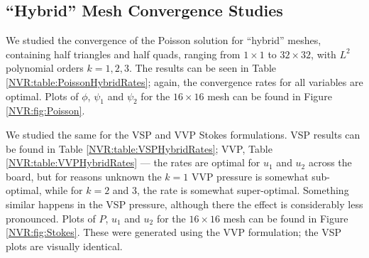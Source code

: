 \subsection{``Hybrid'' Mesh Convergence Studies}

We studied the convergence of the Poisson solution for ``hybrid'' meshes, containing half triangles and half quads, ranging from $1 \times 1$ to $32 \times 32$, with $L^{2}$ polynomial orders $k=1,2,3$.  The results can be seen in Table \ref{NVR:table:PoissonHybridRates}; again, the convergence rates for all variables are optimal. Plots of $\phi$, $\psi_{1}$ and $\psi_{2}$ for the $16 \times 16$ mesh can be found in Figure \ref{NVR:fig:Poisson}.

We studied the same for the VSP and VVP Stokes formulations.  VSP results can be found in Table \ref{NVR:table:VSPHybridRates}; VVP, Table \ref{NVR:table:VVPHybridRates} --- the rates are optimal for $u_{1}$ and $u_{2}$ across the board, but for reasons unknown the $k=1$ VVP pressure is somewhat sub-optimal, while for $k=2$ and 3, the rate is somewhat super-optimal.  Something similar happens in the VSP pressure, although there the effect is considerably less pronounced.  Plots of $P$, $u_{1}$ and $u_{2}$ for the $16 \times 16$ mesh can be found in Figure \ref{NVR:fig:Stokes}.  These were generated using the VVP formulation; the VSP plots are visually identical.





